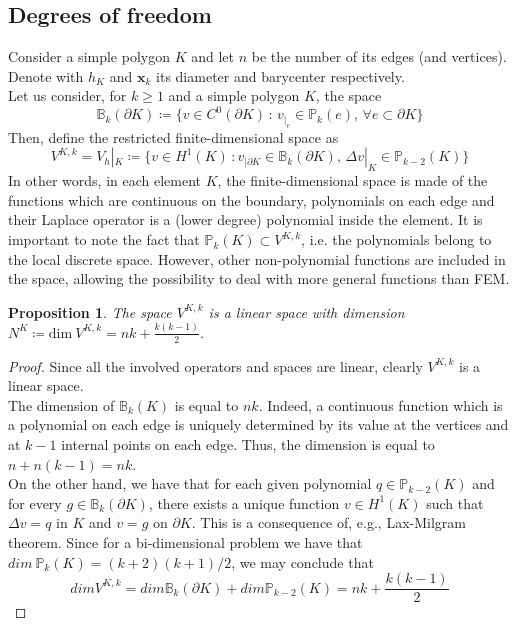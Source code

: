 \documentclass[10pt]{article}
\newtheorem{prop}{Proposition}
\begin{document}
\subsection{Degrees of freedom}
Consider a simple polygon $K$ and let $n$ be the number of its edges (and vertices). Denote with $h_K$ and $\mathbf{x}_k$ its diameter and barycenter respectively.\\
Let us consider, for $k \geq 1$ and a simple polygon $K$, the space
\begin{equation}
	\mathbb{B}_k(\partial K) \coloneqq \lbrace v \in C^0(\partial K) \, : \, v_{|_e} \in \mathbb{P}_k(e), \, \forall e \subset \partial K \rbrace
	\label{eqn:Bk}
\end{equation}
Then, define the restricted finite-dimensional space as
\begin{equation}
	V^{K,k} = V_h|_K \coloneqq \lbrace v \in H^1(K) \, : v_{|\partial K} \in \mathbb{B}_k(\partial K), \, \Delta v |_K \in \mathbb{P}_{k-2}(K) \rbrace
	\label{eqn:VKk}
\end{equation}
In other words, in each element $K$, the finite-dimensional space is made of the functions which are continuous on the boundary, polynomials on each edge and their Laplace operator is a (lower degree) polynomial inside the element. It is important to note the fact that $\mathbb{P}_k(K) \subset V^{K,k}$, i.e. the polynomials belong to the local discrete space. However, other non-polynomial functions are included in the space, allowing the possibility to deal with more general functions than FEM. \\
\begin{prop}
	The space $V^{K,k}$ is a linear space with dimension $N^K \coloneqq \text{dim} \ V^{K,k}= n k + \frac{k(k-1)}{2}$.
	\label{prop:VKk}
\end{prop}
\begin{proof}
	Since all the involved operators and spaces are linear, clearly $V^{K,k}$ is a linear space. \\
	The dimension of $\mathbb{B}_k(K)$ is equal to $nk$. Indeed, a continuous function which is a polynomial on each edge is uniquely determined by its value at the vertices and at $k-1$ internal points on each edge. Thus, the dimension is equal to $n+n(k-1)=nk$. \\
	On the other hand, we have that for each given polynomial $q \in \mathbb{P}_{k-2}(K)$ and for every $g \in \mathbb{B}_k(\partial K)$, there exists a unique function $v \in H^1(K)$ such that $\Delta v=q$ in $K$ and $v=g$ on $\partial K$. This is a consequence of, e.g., Lax-Milgram theorem. Since for a bi-dimensional problem we have that $dim \ \mathbb{P}_k(K)=(k+2)(k+1)/2$, we may conclude that
	$$dim V^{K,k}= dim \mathbb{B}_k(\partial K)+ dim \mathbb{P}_{k-2}(K) = n k + \frac{k(k-1)}{2}$$
\end{proof}
\end{document}
